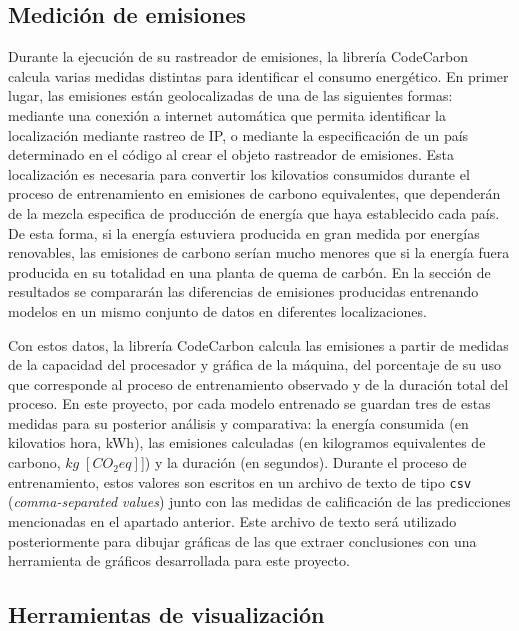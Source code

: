 \subsection{Medición de emisiones}

Durante la ejecución de su rastreador de emisiones, la librería CodeCarbon calcula varias medidas distintas para identificar el consumo energético. En primer lugar, las emisiones están geolocalizadas de una de las siguientes formas: mediante una conexión a internet automática que permita identificar la localización mediante rastreo de IP, o mediante la especificación de un país determinado en el código al crear el objeto rastreador de emisiones. Esta localización es necesaria para convertir los kilovatios consumidos durante el proceso de entrenamiento en emisiones de carbono equivalentes, que dependerán de la mezcla especifica de producción de energía que haya establecido cada país. De esta forma, si la energía estuviera producida en gran medida por energías renovables, las emisiones de carbono serían mucho menores que si la energía fuera producida en su totalidad en una planta de quema de carbón. En la sección de resultados se compararán las diferencias de emisiones producidas entrenando modelos en un mismo conjunto de datos en diferentes localizaciones.

Con estos datos, la librería CodeCarbon calcula las emisiones a partir de medidas de la capacidad del procesador y gráfica de la máquina, del porcentaje de su uso que corresponde al proceso de entrenamiento observado y de la duración total del proceso. En este proyecto, por cada modelo entrenado se guardan tres de estas medidas para su posterior análisis y comparativa: la energía consumida (en kilovatios hora, \unit{kWh}), las emisiones calculadas (en kilogramos equivalentes de carbono, $\unit{kg\;[CO_2eq]}$]) y la duración (en segundos). Durante el proceso de entrenamiento, estos valores son escritos en un archivo de texto de tipo \texttt{csv} (\emph{comma-separated values}) junto con las medidas de calificación de las predicciones mencionadas en el apartado anterior. Este archivo de texto será utilizado posteriormente para dibujar gráficas de las que extraer conclusiones con una herramienta de gráficos desarrollada para este proyecto.


\subsection{Herramientas de visualización}


